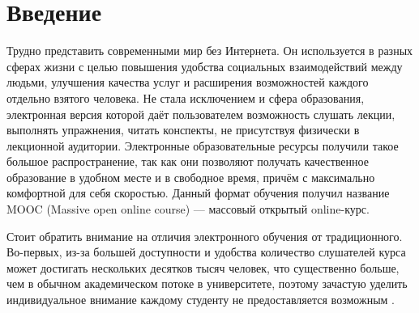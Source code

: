 \documentclass{matmex-diploma-custom}
\begin{document}
\maketitle
\tableofcontents
\section*{Введение}

Трудно представить современными мир без Интернета. Он используется в
разных сферах жизни с целью повышения удобства социальных
взаимодействий между людьми, улучшения качества услуг и расширения
возможностей каждого отдельно взятого человека.  Не стала исключением
и сфера образования, электронная версия которой даёт пользователем
возможность слушать лекции, выполнять упражнения, читать конспекты, не
присутствуя физически в лекционной аудитории. Электронные
образовательные ресурсы получили такое большое распространение, так
как они позволяют получать качественное образование в удобном месте и
в свободное время, причём с максимально комфортной для себя
скоростью. Данный формат обучения получил название MOOC (Massive open
online course) --- массовый открытый online-курс.

Стоит обратить внимание на отличия электронного обучения от
традиционного.  Во-первых, из-за большей доступности и удобства
количество слушателей курса может достигать нескольких десятков тысяч
человек, что существенно больше, чем в обычном академическом потоке в
университете, поэтому зачастую уделить индивидуальное внимание каждому
студенту не предоставляется возможным \cite{breslow2013studying}.
\end{document}
